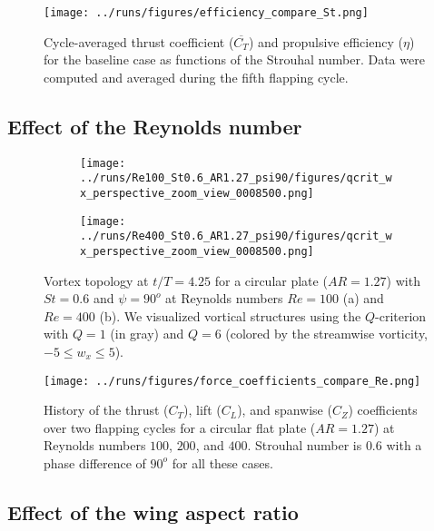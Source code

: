 \begin{figure}
  \centering
  \texttt{[image: ../runs/figures/efficiency\_compare\_St.png]}
  \caption{Cycle-averaged thrust coefficient ($\overline{C_T}$) and propulsive efficiency ($\eta$) for the baseline case as functions of the Strouhal number. Data were computed and averaged during the fifth flapping cycle.}
  \label{fig:strouhal_propulsive_efficiency}
\end{figure}

\subsection{Effect of the Reynolds number}

\begin{figure}
  \centering
  \begin{subfigure}[c]{0.45\textwidth}
    \centering
    \texttt{[image: ../runs/Re100\_St0.6\_AR1.27\_psi90/figures/qcrit\_wx\_perspective\_zoom\_view\_0008500.png]}
    \caption{}
  \end{subfigure}
  \hfill
  \begin{subfigure}[c]{0.45\textwidth}
    \centering
    \texttt{[image: ../runs/Re400\_St0.6\_AR1.27\_psi90/figures/qcrit\_wx\_perspective\_zoom\_view\_0008500.png]}
    \caption{}
  \end{subfigure}
  \caption{Vortex topology at $t / T = 4.25$ for a circular plate ($AR = 1.27$) with $St = 0.6$ and $\psi = 90^o$ at Reynolds numbers $Re = 100$ (a) and $Re = 400$ (b). We visualized vortical structures using the $Q$-criterion with $Q = 1$ (in gray) and $Q = 6$ (colored by the streamwise vorticity, $-5 \leq w_x \leq 5$).}
  \label{fig:reynolds_wake_topology}
\end{figure}

\begin{figure}
  \centering
  \texttt{[image: ../runs/figures/force\_coefficients\_compare\_Re.png]}
  \caption{History of the thrust ($C_T$), lift ($C_L$), and spanwise ($C_Z$) coefficients over two flapping cycles for a circular flat plate ($AR = 1.27$) at Reynolds numbers $100$, $200$, and $400$. Strouhal number is $0.6$ with a phase difference of $90^o$ for all these cases.}
  \label{fig:reynolds_force_coefficients}
\end{figure}

\subsection{Effect of the wing aspect ratio}

